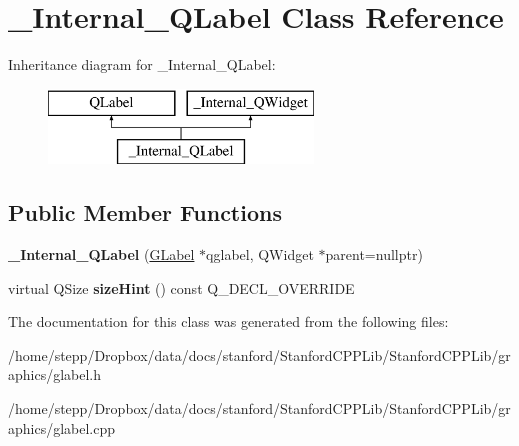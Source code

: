 \hypertarget{class__Internal__QLabel}{}\section{\+\_\+\+Internal\+\_\+\+Q\+Label Class Reference}
\label{class__Internal__QLabel}
Inheritance diagram for \+\_\+\+Internal\+\_\+\+Q\+Label\+:\begin{figure}[H]
\begin{center}
\leavevmode
\includegraphics[height=2.000000cm]{class__Internal__QLabel}
\end{center}
\end{figure}
\subsection*{Public Member Functions}
\begin{DoxyCompactItemize}
\item 
\mbox{\label{class__Internal__QLabel_a6ccdff291f9be587418b8a8c0f8e30fd}} 
{\bfseries \+\_\+\+Internal\+\_\+\+Q\+Label} (\mbox{\hyperlink{classGLabel}{G\+Label}} $\ast$qglabel, Q\+Widget $\ast$parent=nullptr)
\item 
\mbox{\label{class__Internal__QLabel_acc14d6b2b70605187f0d1c7185f5fa1b}} 
virtual Q\+Size {\bfseries size\+Hint} () const Q\+\_\+\+D\+E\+C\+L\+\_\+\+O\+V\+E\+R\+R\+I\+DE
\end{DoxyCompactItemize}


The documentation for this class was generated from the following files\+:\begin{DoxyCompactItemize}
\item 
/home/stepp/\+Dropbox/data/docs/stanford/\+Stanford\+C\+P\+P\+Lib/\+Stanford\+C\+P\+P\+Lib/graphics/glabel.\+h\item 
/home/stepp/\+Dropbox/data/docs/stanford/\+Stanford\+C\+P\+P\+Lib/\+Stanford\+C\+P\+P\+Lib/graphics/glabel.\+cpp\end{DoxyCompactItemize}
